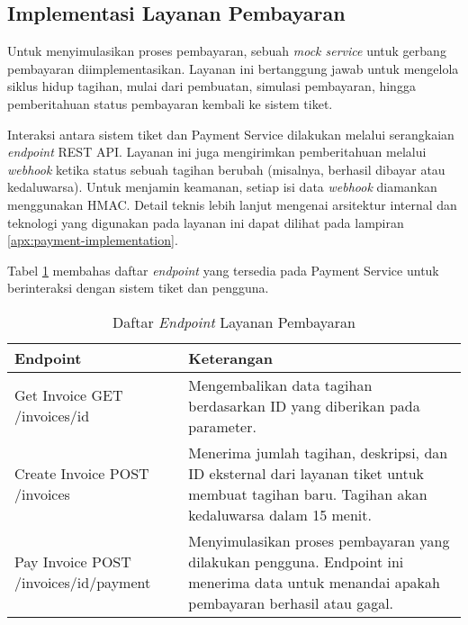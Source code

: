 \subsection{Implementasi Layanan Pembayaran}

Untuk menyimulasikan proses pembayaran, sebuah \textit{mock service} untuk gerbang pembayaran diimplementasikan. Layanan ini bertanggung jawab untuk mengelola siklus hidup tagihan, mulai dari pembuatan, simulasi pembayaran, hingga pemberitahuan status pembayaran kembali ke sistem tiket.

Interaksi antara sistem tiket dan Payment Service dilakukan melalui serangkaian \textit{endpoint} REST API. Layanan ini juga mengirimkan pemberitahuan melalui \textit{webhook} ketika status sebuah tagihan berubah (misalnya, berhasil dibayar atau kedaluwarsa). Untuk menjamin keamanan, setiap isi data \textit{webhook} diamankan menggunakan HMAC. Detail teknis lebih lanjut mengenai arsitektur internal dan teknologi yang digunakan pada layanan ini dapat dilihat pada lampiran \ref{apx:payment-implementation}.

Tabel \ref{table:payment-endpoint} membahas daftar \textit{endpoint} yang tersedia pada Payment Service untuk berinteraksi dengan sistem tiket dan pengguna.

\begin{table}[h!]
\centering
\caption{Daftar \textit{Endpoint} Layanan Pembayaran}
\label{table:payment-endpoint}
\begin{tabular}{|p{}|p{}|}
\hline
\textbf{Endpoint} & \textbf{Keterangan} \\
\hline
Get Invoice \newline GET /invoices/{id} & Mengembalikan data tagihan berdasarkan ID yang diberikan pada parameter. \\
\hline
Create Invoice \newline POST /invoices & Menerima jumlah tagihan, deskripsi, dan ID eksternal dari layanan tiket untuk membuat tagihan baru. Tagihan akan kedaluwarsa dalam 15 menit. \\
\hline
Pay Invoice \newline POST /invoices/{id}/payment & Menyimulasikan proses pembayaran yang dilakukan pengguna. Endpoint ini menerima data untuk menandai apakah pembayaran berhasil atau gagal. \\
\hline
\end{tabular}
\end{table}
